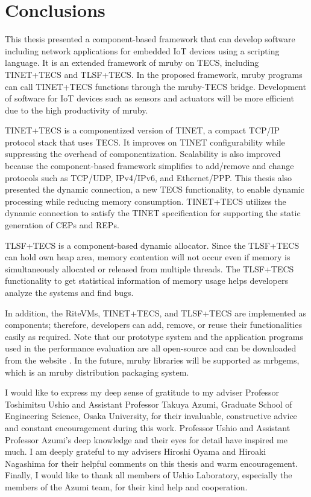 \documentclass[a4j,12pt,oneside,openany,english]{jsbook}
\begin{document}
\chapter{Conclusions}
\label{sec:Conclusion}

This thesis presented a component-based framework that can develop software including network applications for embedded IoT devices using a scripting language.
It is an extended framework of mruby on TECS, including TINET+TECS and TLSF+TECS.
In the proposed framework, mruby programs can call TINET+TECS functions through the mruby-TECS bridge.
Development of software for IoT devices such as sensors and actuators will be more efficient due to the high productivity of mruby.

TINET+TECS is a componentized version of TINET, a compact TCP/IP protocol stack that uses TECS.
It improves on TINET configurability while suppressing the overhead of componentization.
Scalability is also improved because the component-based framework simplifies to add/remove and change protocols such as TCP/UDP, IPv4/IPv6, and Ethernet/PPP.
This thesis also presented the dynamic connection, a new TECS functionality, to enable dynamic processing while reducing memory consumption.
TINET+TECS utilizes the dynamic connection to satisfy the TINET specification for supporting the static generation of CEPs and REPs.

TLSF+TECS is a component-based dynamic allocator.
Since the TLSF+TECS can hold own heap area, memory contention will not occur even if memory is simultaneously allocated or released from multiple threads.
The TLSF+TECS functionality to get statistical information of memory usage helps developers analyze the systems and find bugs.

In addition, the RiteVMs, TINET+TECS, and TLSF+TECS are implemented as components; therefore, developers can add, remove, or reuse their functionalities easily as required.
Note that our prototype system and the application programs used in the performance evaluation are all open-source and can be downloaded from the website \cite{url:TECS}.
In the future, mruby libraries will be supported as mrbgems, which is an mruby distribution packaging system.

\begin{acknowledgment}
I would like to express my deep sense of gratitude to my adviser Professor Toshimitsu Ushio and Assistant Professor Takuya Azumi, Graduate School of Engineering Science, Osaka University, for their invaluable, constructive advice and constant encouragement during this work.
Professor Ushio and Assistant Professor Azumi's deep knowledge and their eyes for detail have inspired me much.
I am deeply grateful to my advisers Hiroshi Oyama and Hiroaki Nagashima for their helpful comments on this thesis and warm encouragement.
Finally, I would like to thank all members of Ushio Laboratory, especially the members of the Azumi team, for their kind help and cooperation.
\end{acknowledgment}
\end{document}
